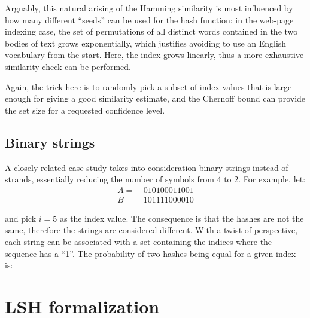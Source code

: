 Arguably, this natural arising of the Hamming similarity is most influenced by how many different ``seeds'' can be used for the hash function: in the web-page indexing case, the set of permutations of all distinct words contained in the two bodies of text grows exponentially, which justifies avoiding to use an English vocabulary from the start. Here, the index grows linearly, thus a more exhaustive similarity check can be performed.

Again, the trick here is to randomly pick a subset of index values that is large enough for giving a good similarity estimate, and the Chernoff bound can provide the set size for a requested confidence level.

\subsection{Binary strings}

A closely related case study takes into consideration binary strings instead of \dna{} strands, essentially reducing the number of symbols from 4 to 2. For example, let:
\begin{align*}
    A =&\ 010100011001 \\
    B =&\ 101111000010
\end{align*}

and pick $i = 5$ as the index value. The consequence is that the hashes are not the same, therefore the strings are considered different. With a twist of perspective, each string can be associated with a set containing the indices where the sequence has a ``1''. The probability of two hashes being equal for a given index is:



\section{LSH formalization}



